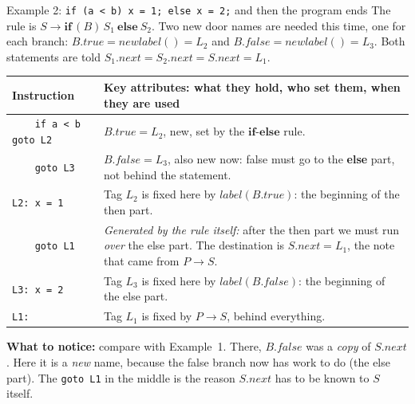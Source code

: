 \documentclass[11pt,a4paper]{article}
\newcommand{\at}[2]{\ensuremath{#1.\mathit{#2}}}
\begin{document}
\begin{examplebox}{Example 2: \texttt{if (a < b) x = 1; else x = 2;} and then the program ends}
The rule is $S\to\mathbf{if}\,(B)\,S_1\ \mathbf{else}\ S_2$. Two new door names are needed this time, one for each branch: \at{B}{true}$=\mathit{newlabel}()=L_2$ and \at{B}{false}$=\mathit{newlabel}()=L_3$. Both statements are told \at{S_1}{next}$=\at{S_2}{next}=\at{S}{next}=L_1$.
\begin{center}
\small
\begin{tabular}{@{}l p{10.4cm}@{}}
\toprule
\textbf{Instruction} & \textbf{Key attributes: what they hold, who set them, when they are used} \\ \midrule
\texttt{\ \ \ \ if a < b goto L2} & \at{B}{true}$=L_2$, new, set by the $\mathbf{if}$-$\mathbf{else}$ rule. \\[3pt]
\texttt{\ \ \ \ goto L3} & \at{B}{false}$=L_3$, also new now: false must go to the \textbf{else} part, not behind the statement. \\[3pt]
\texttt{L2: x = 1} & Tag $L_2$ is fixed here by $\mathit{label}(\at{B}{true})$: the beginning of the then part. \\[3pt]
\texttt{\ \ \ \ goto L1} & \emph{Generated by the rule itself:} after the then part we must run \emph{over} the else part. The destination is \at{S}{next}$=L_1$, the note that came from $P\to S$. \\[3pt]
\texttt{L3: x = 2} & Tag $L_3$ is fixed here by $\mathit{label}(\at{B}{false})$: the beginning of the else part. \\[3pt]
\texttt{L1:} & Tag $L_1$ is fixed by $P\to S$, behind everything. \\ \bottomrule
\end{tabular}
\end{center}
\textbf{What to notice:} compare with Example~1. There, \at{B}{false} was a \emph{copy} of \at{S}{next}. Here it is a \emph{new} name, because the false branch now has work to do (the else part). The \texttt{goto L1} in the middle is the reason \at{S}{next} has to be known to $S$ itself.
\end{examplebox}
\end{document}
